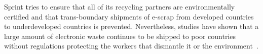 Sprint tries to ensure that all of its recycling partners are environmentally
certified and that trans-boundary shipments of e-scrap from developed
countries to underdeveloped countries is prevented. Nevertheless, studies
have shown that a large amount of electronic waste continues to be shipped to
poor countries without regulations protecting the workers that dismantle it
or the environment~\cite{etbc-dumping}. 

\begin{comment}


Part of the problem is that
system-on-chip smartphone designs are difficult to repair and dismantle, and
while the PhoneBloks project aims to create a modular ``phone worth
keeping''~\cite{phonebloks-url}, we believe that the form factor facilitated
by more integrated designs will continue to appeal to all but the most
environmentally-conscious consumers.

\end{comment}
